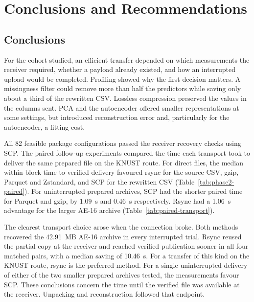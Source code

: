 \chapter{Conclusions and Recommendations}\label{conclusion}
\section{Conclusions}
For the cohort studied, an efficient transfer depended on which measurements the receiver required, whether a payload already existed, and how an interrupted upload would be completed. Profiling showed why the first decision matters. A missingness filter could remove more than half the predictors while saving only about a third of the rewritten CSV. Lossless compression preserved the values in the columns sent. PCA and the autoencoder offered smaller representations at some settings, but introduced reconstruction error and, particularly for the autoencoder, a fitting cost.

All 82 feasible package configurations passed the receiver recovery checks using SCP. The paired follow-up experiments compared the time each transport took to deliver the same prepared file on the KNUST route. For direct files, the median within-block time to verified delivery favoured rsync for the source CSV, gzip, Parquet and Zstandard, and SCP for the rewritten CSV (Table~\ref{tab:phase2-paired}). For uninterrupted prepared archives, SCP had the shorter paired time for Parquet and gzip, by 1.09~s and 0.46~s respectively. Rsync had a 1.06~s advantage for the larger AE-16 archive (Table~\ref{tab:paired-transport}).

The clearest transport choice arose when the connection broke. Both methods recovered the 42.91~MB AE-16 archive in every interrupted trial. Rsync reused the partial copy at the receiver and reached verified publication sooner in all four matched pairs, with a median saving of 10.46~s. For a transfer of this kind on the KNUST route, rsync is the preferred method. For a single uninterrupted delivery of either of the two smaller prepared archives tested, the measurements favour SCP. These conclusions concern the time until the verified file was available at the receiver. Unpacking and reconstruction followed that endpoint.

